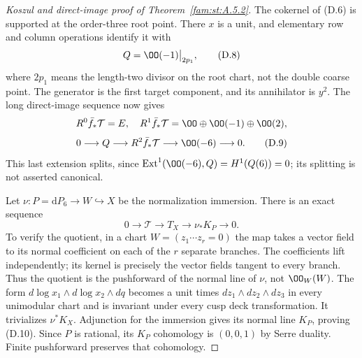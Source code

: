 \begin{proof}[Koszul and direct-image proof of Theorem~\ref{fam:st:A.5.2}]
The cokernel of (D.6) is supported at the order-three root point. There
$x$ is a unit, and elementary row and column operations identify it
with
\[
 Q=\OO(-1)\big|_{2p_1},                               \tag{D.8}
\]
where $2p_1$ means the length-two divisor on the root chart, not the
double coarse point. The generator is the first target component,
and its annihilator is $y^2$. The long direct-image sequence now gives
\[
 R^0\bar f_*\mathcal T=E,\quad
 R^1\bar f_*\mathcal T=\OO\oplus\OO(-1)\oplus\OO(2),
\]
\[
 0\longrightarrow Q\longrightarrow R^2\bar f_*\mathcal T
 \longrightarrow\OO(-6)\longrightarrow0.              \tag{D.9}
\]
This last extension splits, since $\operatorname{Ext}^1(\OO(-6),Q)
=H^1(Q(6))=0$; its splitting is not asserted canonical.

Let $\nu:P=\mathrm dP_6\to W\hookrightarrow X$ be the normalization
immersion. There is an exact sequence
\[
 0\longrightarrow\mathcal T\longrightarrow T_X
 \longrightarrow\nu_*K_P\longrightarrow0.             \tag{D.10}
\]
To verify the quotient, in a chart $W=(z_1\cdots z_r=0)$ the map takes
a vector field to its normal coefficient on each of the $r$ separate
branches. The coefficients lift independently; its kernel is precisely
the vector fields tangent to every branch. Thus the quotient is the
pushforward of the normal line of $\nu$, not $\OO_W(W)$.
The form $d\log x_1\wedge d\log x_2\wedge dq$ becomes a unit times
$dz_1\wedge dz_2\wedge dz_3$ in every unimodular chart and is invariant
under every cusp deck transformation. It trivializes $\nu^*K_X$.
Adjunction for the immersion gives its normal line $K_P$, proving
(D.10). Since $P$ is rational, its $K_P$ cohomology is $(0,0,1)$ by
Serre duality. Finite pushforward preserves that cohomology.


\end{proof}
